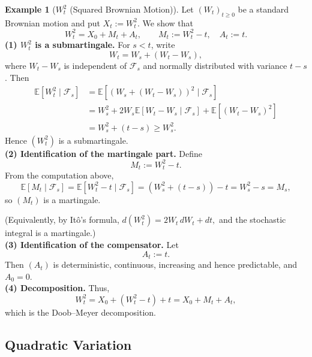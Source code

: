 \documentclass[11pt,a4paper]{article}
\theoremstyle{definition}
\newtheorem{example}{Example}[section]
\begin{document}
\begin{example}[$W_t^2$ (Squared Brownian Motion)]\label{ex:bm2_dm}
Let $(W_t)_{t\ge 0}$ be a standard Brownian motion and put $X_t := W_t^2$.  
We show that
\[
    W_t^2 = X_0 + M_t + A_t,
\qquad 
M_t := W_t^2 - t,\quad 
A_t := t.
\]
\noindent
\textbf{(1) $W_t^2$ is a submartingale.}  
For $s<t$, write
\[
W_t = W_s + (W_t-W_s),
\]
where $W_t - W_s$ is independent of $\mathcal{F}_s$ and normally distributed with variance $t-s$.  
Then
\begin{align*}
\mathbb{E}[W_t^2 \mid \mathcal{F}_s]
&= \mathbb{E}[(W_s + (W_t-W_s))^2 \mid \mathcal{F}_s] \\
&= W_s^2 
  + 2W_s\mathbb{E}[W_t-W_s \mid \mathcal{F}_s]
  + \mathbb{E}[(W_t-W_s)^2] \\
&= W_s^2 + (t-s) \ge W_s^2.
\end{align*}
Hence $(W_t^2)$ is a submartingale.\\ \noindent
\textbf{(2) Identification of the martingale part.}  
Define
\[
M_t := W_t^2 - t.
\]
From the computation above,
\[
\mathbb{E}[M_t \mid \mathcal{F}_s]
= \mathbb{E}[W_t^2 - t \mid \mathcal{F}_s]
= (W_s^2 + (t-s)) - t
= W_s^2 - s
= M_s,
\]
so $(M_t)$ is a martingale.

(Equivalently, by Itô's formula,
\(
d(W_t^2)=2W_t\,dW_t + dt,
\)
and the stochastic integral is a martingale.)
\\ \noindent
\textbf{(3) Identification of the compensator.}  
Let
\[
A_t := t.
\]
Then $(A_t)$ is deterministic, continuous, increasing and hence predictable, and $A_0=0$.
~\\ \noindent
\textbf{(4) Decomposition.}  
Thus,
\[
W_t^2 = X_0 + (W_t^2 - t) + t
      = X_0 + M_t + A_t,
\]
which is the Doob--Meyer decomposition.
\end{example}


\subsection{Quadratic Variation}
\end{document}
